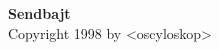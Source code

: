 \documentclass[a4paper,polish,titlepage,12pt]{article}
\begin{document}
\begin{titlepage}
\begin{center}
\vspace{4in}
{\Huge\bf Sendbajt}\\
{\small Copyright 1998 by <oscyloskop>}
\end{center}
\end{titlepage}
\end{document}
